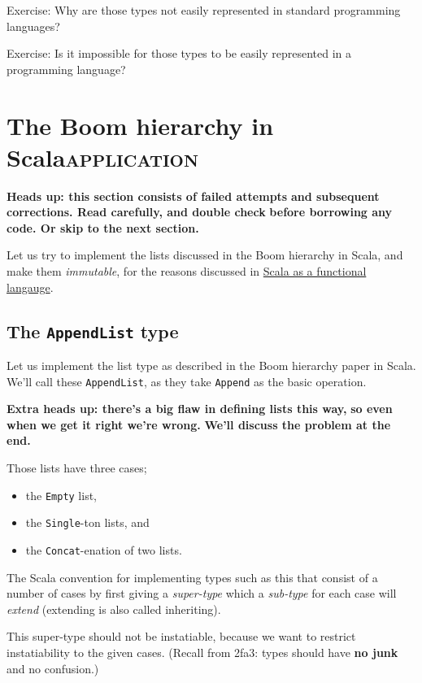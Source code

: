 \documentclass[11pt]{article}
\begin{document}
Exercise: Why are those types not easily represented in standard
programming languages?

Exercise: Is it impossible for those types to be easily represented
in a programming language?

\section{The Boom hierarchy in Scala\hfill{}\textsc{application}}
\label{sec:orge3329ae}
\begin{center}
\textbf{Heads up: this section consists of failed attempts}
\textbf{and subsequent corrections. Read carefully, and double check}
\textbf{before borrowing any code. Or skip to the next section.}
\end{center}

Let us try to implement the lists discussed in the Boom hierarchy
in Scala, and make them \emph{immutable}, for the reasons discussed in
\hyperref[sec:orgdf45b44]{Scala as a functional langauge}.

\subsection{The \texttt{AppendList} type}
\label{sec:org251ed6a}
Let us implement the list type as described in the Boom hierarchy paper
in Scala. We'll call these \texttt{AppendList}, as they take \texttt{Append} as
the basic operation.

\begin{center}
\textbf{Extra heads up: there's a big flaw in defining lists this way,}
\textbf{so even when we get it right we're wrong.}
\textbf{We'll discuss the problem at the end.}
\end{center}

Those lists have three cases;
\begin{itemize}
\item the \texttt{Empty} list,
\item the \texttt{Single}-ton lists, and
\item the \texttt{Concat}-enation of two lists.
\end{itemize}

The Scala convention for implementing types such as this
that consist of a number of cases by first giving
a \emph{super-type} which a \emph{sub-type}
for each case will \emph{extend} (extending is also called inheriting).

This super-type should not be instatiable,
because we want to restrict instatiability to the given cases.
(Recall from 2fa3: types should have \textbf{no junk} and no confusion.) 
\end{document}
